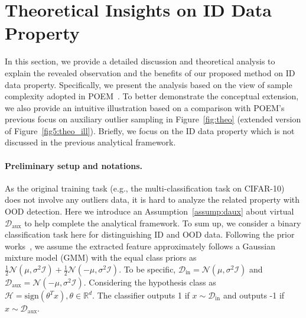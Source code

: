 \documentclass{article}
\theoremstyle{plain}
\theoremstyle{definition}
\theoremstyle{remark}
\begin{document}
\section{Theoretical Insights on ID Data Property}
\label{app:theo}

In this section, we provide a detailed discussion and theoretical analysis to explain the revealed observation and the benefits of our proposed method on ID data property. Specifically, we present the analysis based on the view of sample complexity adopted in POEM~\citep{ming2022poem}. To better demonstrate the conceptual extension, we also provide an intuitive illustration based on a comparison with POEM's previous focus on auxiliary outlier sampling in Figure~\ref{fig:theo} (extended version of Figure~\ref{fig5:theo_ill}). Briefly, we focus on the ID data property which is not discussed in the previous analytical framework.

\paragraph{Preliminary setup and notations.} As the original training task (e.g., the multi-classification task on CIFAR-10) does not involve any outliers data, it is hard to analyze the related property with OOD detection. Here we introduce an Assumption~\ref{assump:daux} about virtual $\mathcal{D}_\text{aux}$ to help complete the analytical framework. 
To sum up, we consider a binary classification task here for distinguishing ID and OOD data. Following the prior works~\citep{LeeLLS18,SehwagCM21,ming2022poem}, we assume the extracted feature approximately follows a Gaussian mixture model (GMM) with the equal class priors as $\frac{1}{2}\mathcal{N}(\mu,\sigma^2\mathcal{I})+\frac{1}{2}\mathcal{N}(-\mu,\sigma^2\mathcal{I})$. To be specific,  $\mathcal{D}_\text{in}=\mathcal{N}(\mu, \sigma^2\mathcal{I})$ and $\mathcal{D}_\text{aux}=\mathcal{N}(-\mu, \sigma^2\mathcal{I})$. Considering the hypothesis class as $\mathcal{H}={\text{sign}(\theta^Tx), \theta\in\mathbb{R}^d}$. The classifier outputs 1 if $x\sim\mathcal{D}_\text{in}$ and outputs -1 if $x\sim\mathcal{D}_\text{aux}$.
\end{document}
